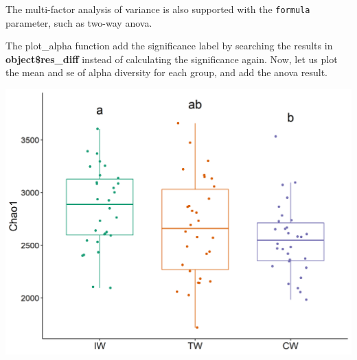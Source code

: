 \documentclass[
]{book}
\newenvironment{Shaded}{\begin{snugshade}}{\end{snugshade}}
\newcommand{\AttributeTok}[1]{\textcolor[rgb]{0.77,0.63,0.00}{#1}}
\newcommand{\CommentTok}[1]{\textcolor[rgb]{0.56,0.35,0.01}{\textit{#1}}}
\newcommand{\ConstantTok}[1]{\textcolor[rgb]{0.00,0.00,0.00}{#1}}
\newcommand{\DecValTok}[1]{\textcolor[rgb]{0.00,0.00,0.81}{#1}}
\newcommand{\FunctionTok}[1]{\textcolor[rgb]{0.00,0.00,0.00}{#1}}
\newcommand{\NormalTok}[1]{#1}
\newcommand{\OtherTok}[1]{\textcolor[rgb]{0.56,0.35,0.01}{#1}}
\newcommand{\SpecialCharTok}[1]{\textcolor[rgb]{0.00,0.00,0.00}{#1}}
\newcommand{\StringTok}[1]{\textcolor[rgb]{0.31,0.60,0.02}{#1}}
\begin{document}
The multi-factor analysis of variance is also supported with the \texttt{formula} parameter, such as two-way anova.

\begin{Shaded}
\end{Shaded}

The plot\_alpha function add the significance label by searching the results in \textbf{object\$res\_diff} instead of calculating the significance again.
Now, let us plot the mean and se of alpha diversity for each group, and add the anova result.

\begin{Shaded}
\end{Shaded}

\begin{center}\includegraphics[width=600px]{Images/plot_alpha_letter} \end{center}
\end{document}
